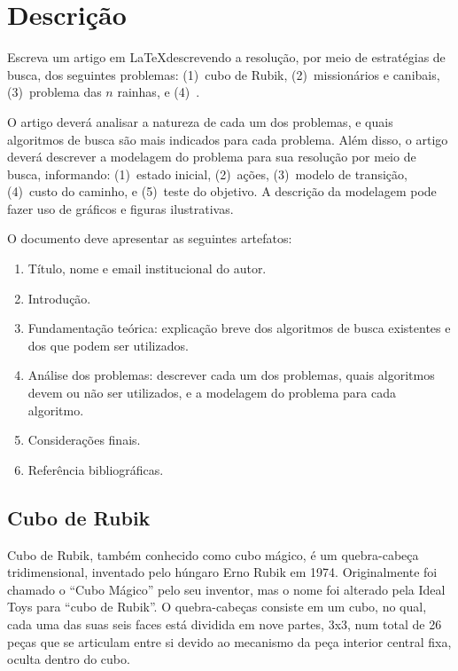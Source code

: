 \documentclass[a4paper,11pt]{karticle}
\title{\tb{Prova 1: artigo}}
\author{Prof. Chauã Queirolo}
\date{}
\begin{document}
\maketitle

\section*{Descrição}

Escreva um artigo em \LaTeX descrevendo a resolução, por meio de estratégias de busca, dos seguintes problemas: (1)~cubo de Rubik, (2)~missionários e canibais, (3)~problema das $n$ rainhas, e (4)~.

O artigo deverá analisar a natureza de cada um dos problemas, e quais algoritmos de busca são mais indicados para cada problema. Além disso, o artigo deverá descrever a modelagem do problema para sua resolução por meio de busca, informando: (1)~estado inicial, (2)~ações, (3)~modelo de transição, (4)~custo do caminho, e (5)~teste do objetivo. A descrição da modelagem pode fazer uso de gráficos e figuras ilustrativas.

O documento deve apresentar as seguintes artefatos:

\begin{enumerate}
    \item Título, nome e email institucional do autor.
    \item Introdução.
    \item Fundamentação teórica: explicação breve dos algoritmos de busca existentes e dos que podem ser utilizados.
    \item Análise dos problemas: descrever cada um dos problemas, quais algoritmos devem ou não ser utilizados, e a modelagem do problema para cada algoritmo.
    \item Considerações finais.
    \item Referência bibliográficas.
\end{enumerate}


\subsection*{Cubo de Rubik}

Cubo de Rubik, também conhecido como cubo mágico, é um quebra-cabeça tridimensional, inventado pelo húngaro Erno Rubik em 1974. Originalmente foi chamado o ``Cubo Mágico'' pelo seu inventor, mas o nome foi alterado pela Ideal Toys para ``cubo de Rubik''. O quebra-cabeças consiste em um cubo, no qual, cada uma das suas seis faces está dividida em nove partes, 3x3, num total de 26 peças que se articulam entre si devido ao mecanismo da peça interior central fixa, oculta dentro do cubo. 
\end{document}
